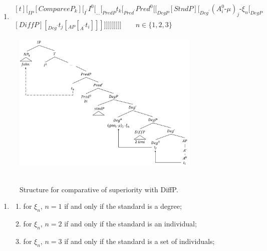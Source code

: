 \documentclass{ctexart}
\begin{document}
\begin{enumerate}
    \item \label{superiority_structure_with_DiffP}
    $\begin{aligned}[t]
        [_{IP} [CompareeP_k] [_{I^{\prime}} I^{0} [_{...} [_{PredP} t_k [_{Pred^{\prime}} Pred^0 [[_{DegP} [StndP] [_{Deg^{\prime}} (A_i^0 \mbox{-} \mu)_j \mbox{-} \xi_{n} [_{DegP} \\ [DiffP] [_{Deg^{\prime}} t_j [_{AP} [_{A^{\prime}} t_i]]]]]]]]]]]] 
        \qquad n \in \{1, 2, 3\}
    \end{aligned}$
\end{enumerate}

\begin{figure}[H]
    \centering
    \includegraphics[width=0.8\textwidth]{pic/superiority_structure_diff.png}
    \begin{caption}
        \\ \vspace{-1.1ex}
        Structure for comparative of superiority with DiffP.
    \end{caption}
\end{figure}

\begin{enumerate}
    \item \label{superiority_example_10}
    \begin{enumerate}
        \item \label{superiority_example_10_a}
        for $\xi_n$, $n=1$ if and only if the standard is a degree;

        \item \label{superiority_example_10_b}
        for $\xi_n$, $n=2$ if and only if the standard is an individual;

        \item \label{superiority_example_10_c}
        for $\xi_n$, $n=3$ if and only if the standard is a set of individuals;

    \end{enumerate}
\end{enumerate}
\end{document}
